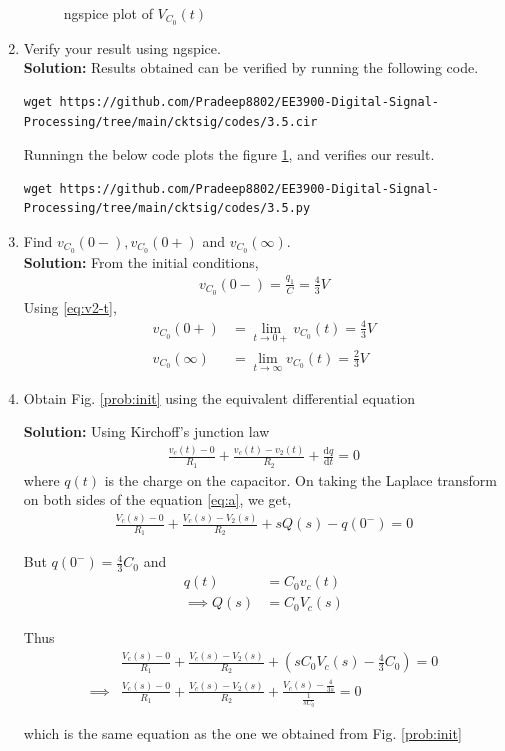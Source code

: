 \documentclass[journal,12pt,twocolumn]{IEEEtran}
\newcommand{\solution}{\noindent \textbf{Solution: }}
\providecommand{\brak}[1]{\ensuremath{\left(#1\right)}}
\providecommand{\der}[1]{\mathrm{d} #1}
\numberwithin{equation}{section}
\renewcommand\thesection{\arabic{section}}
\begin{document}
\begin{enumerate}[label=\arabic*.,ref=\thesection.\theenumi]
\begin{figure}[!ht]
	\caption{ngspice plot of $V_{C_0}(t)$} 
	\label{fig:ngspice2}
\end{figure}
	\item Verify your result using ngspice.\\
	\solution Results obtained can be verified by running the following code.
	\begin{lstlisting}
wget https://github.com/Pradeep8802/EE3900-Digital-Signal-Processing/tree/main/cktsig/codes/3.5.cir
	\end{lstlisting}
Runningn the below code plots the figure \ref{fig:ngspice2}, and verifies our result.
	\begin{lstlisting}
wget https://github.com/Pradeep8802/EE3900-Digital-Signal-Processing/tree/main/cktsig/codes/3.5.py
	\end{lstlisting}



	\item Find $v_{C_0}(0-), v_{C_0}(0+)$ and  $v_{C_0}(\infty) $.\\
\solution From the initial conditions,
\begin{align}
    v_{C_0}(0-) = \frac{q_1}{C} = {\frac{4}{3}}{V}
\end{align}
Using \eqref{eq:v2-t},
\begin{align}
    v_{C_0}(0+) &= \lim_{t \to 0+}v_{C_0}(t) = {\frac{4}{3}}{V} \\
    v_{C_0}(\infty) &= \lim_{t \to \infty}v_{C_0}(t) = {\frac{2}{3}}{V}
\end{align}

\item Obtain Fig. \ref{prob:init} using the equivalent differential equation

\solution Using Kirchoff's junction law
\begin{align}
	\label{eq:a}
	\frac{v_c(t) - 0}{R_1} + \frac{v_c(t) - v_2(t)}{R_2} + \frac{\der{q}}{\der{t}} = 0
\end{align}
where $q(t)$ is the charge on the capacitor.
On taking the Laplace transform on both sides of the equation \eqref{eq:a}, we get,
\begin{align}
	\frac{V_c(s) - 0}{R_1} + \frac{V_c(s) - V_2(s)}{R_2} +sQ(s) - q(0^-) = 0
\end{align}

But $q(0^-) = \frac43 C_0$ and 
\begin{align}
	q(t) &= C_0v_c(t) \\
	\implies Q(s) &= C_0V_c(s)
\end{align}

Thus
\begin{align}
	&\frac{V_c(s) - 0}{R_1} + \frac{V_c(s) - V_2(s)}{R_2} + \brak{sC_0V_c(s) - \frac43 C_0} = 0 \\
	\implies &\frac{V_c(s) - 0}{R_1} + 	\frac{V_c(s) - V_2(s)}{R_2} + \frac{V_c(s) - \frac{4}{3s}}{\frac{1}{sC_0}} = 0 
\end{align}

which is the same equation as the one we obtained from Fig. \ref{prob:init}
\end{enumerate}
\end{document}
